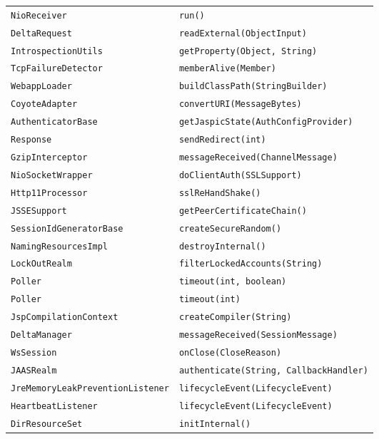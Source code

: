 \begin{center}
\begin{longtable}{ll}
\lstinline/NioReceiver/&{\lstinline/run()/}\\
\lstinline/DeltaRequest/&{\lstinline/readExternal(ObjectInput)/}\\
\lstinline/IntrospectionUtils/&{\lstinline/getProperty(Object, String)/}\\
\lstinline/TcpFailureDetector/&{\lstinline/memberAlive(Member)/}\\
\lstinline/WebappLoader/&{\lstinline/buildClassPath(StringBuilder)/}\\
\lstinline/CoyoteAdapter/&{\lstinline/convertURI(MessageBytes)/}\\
\lstinline/AuthenticatorBase/&{\lstinline/getJaspicState(AuthConfigProvider)/}\\
\lstinline/Response/&{\lstinline/sendRedirect(int)/}\\
\lstinline/GzipInterceptor/&{\lstinline/messageReceived(ChannelMessage)/}\\
\lstinline/NioSocketWrapper/&{\lstinline/doClientAuth(SSLSupport)/}\\
\lstinline/Http11Processor/&{\lstinline/sslReHandShake()/}\\
\lstinline/JSSESupport/&{\lstinline/getPeerCertificateChain()/}\\
\lstinline/SessionIdGeneratorBase/&{\lstinline/createSecureRandom()/}\\
\lstinline/NamingResourcesImpl/&{\lstinline/destroyInternal()/}\\
\lstinline/LockOutRealm/&{\lstinline/filterLockedAccounts(String)/}\\
\lstinline/Poller/&{\lstinline/timeout(int, boolean)/}\\
\lstinline/Poller/&{\lstinline/timeout(int)/}\\
\lstinline/JspCompilationContext/&{\lstinline/createCompiler(String)/}\\
\lstinline/DeltaManager/&{\lstinline/messageReceived(SessionMessage)/}\\
\lstinline/WsSession/&{\lstinline/onClose(CloseReason)/}\\
\lstinline/JAASRealm/&{\lstinline/authenticate(String, CallbackHandler)/}\\
\lstinline/JreMemoryLeakPreventionListener/&{\lstinline/lifecycleEvent(LifecycleEvent)/}\\
\lstinline/HeartbeatListener/&{\lstinline/lifecycleEvent(LifecycleEvent)/}\\
\lstinline/DirResourceSet/&{\hspace*{-3pt}\lstinline/initInternal()/}\\

\end{longtable}
\end{center}
